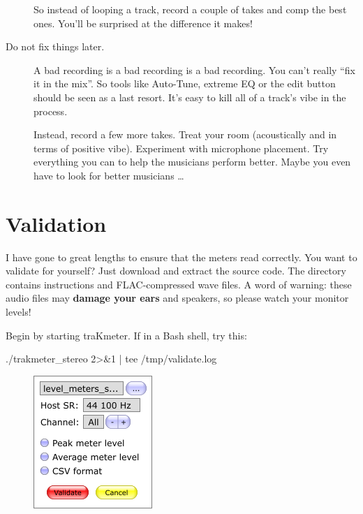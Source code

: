 \begin{description}
  So instead of looping a track, record a couple of takes and comp the
  best ones.  You'll be surprised at the difference it makes!

\item[Do not fix things later.]  A bad recording is a bad recording is
  a bad recording.  You can't really ``fix it in the mix''.  So tools
  like Auto-Tune, extreme EQ or the edit button should be seen as a
  last resort.  It's easy to kill all of a track's vibe in the
  process.

  Instead, record a few more takes.  Treat your room (acoustically and
  in terms of positive vibe).  Experiment with microphone placement.
  Try everything you can to help the musicians perform better.  Maybe
  you even have to look for better musicians \dots

\end{description}

\chapter{Validation}
\label{chap:validation}

I have gone to great lengths to ensure that the meters read correctly.
You want to validate for yourself?  Just download and extract the
source code.  The directory  contains instructions
and FLAC-compressed wave files.  A word of warning: these audio files
may \textbf{damage your ears} and speakers, so please watch your
monitor levels!

Begin by starting traKmeter.  If in a Bash shell, try this:

\begin{VerbatimBoth}
  ./trakmeter_stereo 2>&1 | tee /tmp/validate.log
\end{VerbatimBoth}

\begin{figure}
\includegraphics[scale=0.60,clip]{include/images/dialog_validation.png}
\end{figure}

